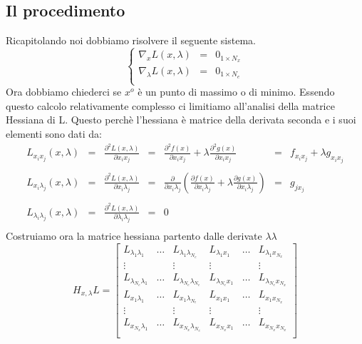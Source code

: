 \subsection{Il procedimento}
Ricapitolando noi dobbiamo risolvere il seguente sistema.
$$
\left\{
\begin{array}{ccc}
\nabla_xL(x,\lambda)&=& 0_{1\times N_x}\\
\nabla_\lambda L(x,\lambda)&=& 0_{1\times N_e}\\
\end{array}\right.
$$
Ora dobbiamo chiederci se $x^o$ è un punto di massimo o di minimo. Essendo questo calcolo relativamente complesso ci limitiamo all'analisi della matrice Hessiana di L. Questo perchè l'hessiana è matrice della derivata seconda e i suoi elementi sono dati da:
$$
\begin{array}{ccccccc}
L_{x_ix_j}(x,\lambda)&=&\frac{\partial^2L(x,\lambda)}{\partial x_ix_j}&=&\frac{\partial^2f(x)}{\partial x_ix_j}+\lambda \frac{\partial^2g(x)}{\partial x_ix_j}&=&f_{x_ix_j}+\lambda g_{x_ix_j}\\
\\
L_{x_i\lambda_j}(x,\lambda)&=&\frac{\partial^2L(x,\lambda)}{\partial x_i\lambda_j}&=&\frac{\partial}{\partial x_i\lambda_j}\left ( \frac{\partial f(x)}{\partial x_i\lambda_j}+\lambda \frac{\partial g(x)}{\partial x_i\lambda_j}\right )&=& g_{jx_j}\\
\\
L_{\lambda_i\lambda_j}(x,\lambda)&=&\frac{\partial^2L(x,\lambda)}{\partial \lambda_i\lambda_j}&=&0\\
\end{array}
$$
Costruiamo ora la matrice hessiana partento dalle derivate $\lambda\lambda$
$$
H_{x,\lambda}L=\left [
\begin{array}{cccccc}
L_{\lambda_1\lambda_1}&\dots&L_{\lambda_1\lambda_{N_e}}&L_{\lambda_1x_1}&\dots&L_{\lambda_1x_{N_x}}\\
\vdots&&\vdots&\vdots&&\vdots\\
L_{\lambda_{N_e}\lambda_1}&\dots&L_{\lambda_{N_e}\lambda_{N_e}}&L_{\lambda_{N_e}x_1}&\dots&L_{\lambda_{N_e}x_{N_x}}\\
L_{x_1\lambda_1}&\dots&L_{x_1\lambda_{N_e}}&L_{x_1x_1}&\dots&L_{x_1x_{N_x}}\\
\vdots&&\vdots&\vdots&&\vdots\\
L_{x_{N_x}\lambda_1}&\dots&L_{x_{N_x}\lambda_{N_e}}&L_{x_{N_x}x_1}&\dots&L_{x_{N_x}x_{N_x}}\\
\end{array}
\right ]
$$
